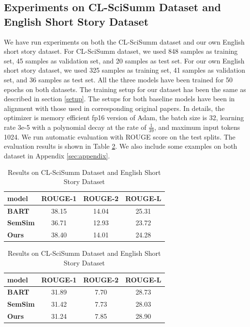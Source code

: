 \documentclass[11pt,a4paper]{article}
\begin{document}
\subsection{Experiments on CL-SciSumm Dataset and English Short Story Dataset}

We have run experiments on both the CL-SciSumm dataset and our own English short story dataset. For CL-SciSumm dataset, we used 848 samples as training set, 45 samples as validation set, and 20 samples as test set. For our own English short story dataset, we used 325 samples as training set, 41 samples as validation set, and 36 samples as test set. All the three models have been trained for 50 epochs on both datasets. The training setup for our dataset has been the same as described in section \ref{setup}. The setups for both baseline models have been in alignment with those used in corresponding original papers. In details, the optimizer is memory efficient fp16 version of Adam, the batch size is 32, learning rate 3e-5 with a polynomial decay at the rate of $\frac{1}{39}$, and maximum input tokens 1024. We run automatic evaluation with ROUGE score on the test splits. The evaluation results is shown in Table \ref{tab:exp}. We also include some examples on both dataset in Appendix \ref{sec:appendix}.

\begin{table}[h]
    \centering
    \caption{Results on CL-SciSumm Dataset and English Short Story Dataset}
    \label{tab:exp}
    \begin{tabular}{|l|c|c|c|}
    \hline
        model & ROUGE-1 & ROUGE-2 & ROUGE-L \\\hline
        \textbf{BART} & 38.15 & 14.04 & 25.31 \\\hline
        \textbf{SemSim} & 36.71 & 12.93 & 23.72 \\\hline
        \textbf{Ours} & 38.40 & 14.01 & 24.28 \\\hline
    \end{tabular}
    \begin{tabular}{|l|c|c|c|}
    \hline
        model & ROUGE-1 & ROUGE-2 & ROUGE-L \\\hline
        \textbf{BART} & 31.89 & 7.70 & 28.73 \\\hline
        \textbf{SemSim} & 31.42 & 7.73 & 28.03 \\\hline
        \textbf{Ours} & 31.24 & 7.85 & 28.90 \\\hline
    \end{tabular}
\end{table}
\end{document}
